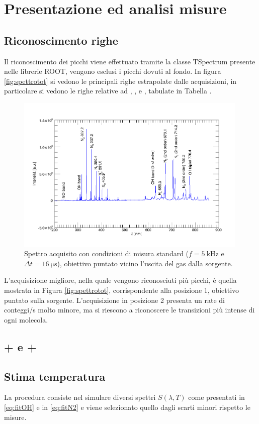 \section{Presentazione ed analisi misure}

\subsection{Riconoscimento righe}
Il riconoscimento dei picchi viene effettuato tramite la classe TSpectrum presente nelle librerie ROOT, vengono esclusi i picchi dovuti al fondo.
In figura \ref{fig:spettrotot} si vedono le principali righe estrapolate dalle acquisizioni, in particolare si vedono le righe relative ad , ,  e , tabulate in Tabella %
.

\begin{figure}
\centering
\includegraphics[width=0.99\textwidth]{Immagini/spettrotot_unico_label.png}
\caption{Spettro acquisito con condizioni di misura standard ($f = \SI{5}{\kilo\hertz}$ e $\Delta t = \SI{16}{\micro\second}$), obiettivo puntato vicino l'uscita del gas dalla sorgente.}
\label{fig:app}
\end{figure}

L'acquisizione migliore, nella quale vengono riconosciuti più picchi, è quella mostrata in Figura \ref{fig:spettrotot}, corrispondente alla posizione 1, obiettivo puntato sulla sorgente. L'acquisizione in posizione 2 presenta un rate di conteggi/s molto minore, ma si riescono a riconoscere le transizioni più intense di ogni molecola.


\subsection{ +  e  + }


\subsection{Stima temperatura}
 La procedura consiste nel simulare diversi spettri $S(\lambda,T)$ come presentati in \ref{eq:fitOH} e in \ref{eq:fitN2} e viene selezionato quello dagli scarti minori rispetto le misure.
 
